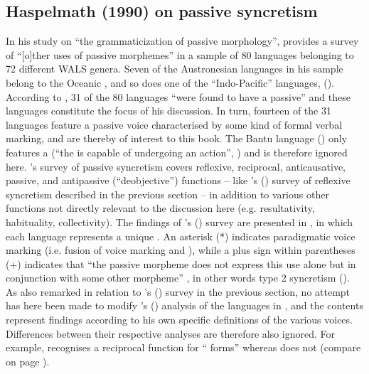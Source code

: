 \subsection{Haspelmath (1990) on passive syncretism} \label{haspelmath-syncretism}
In his study on “the grammaticization of passive morphology”, \cite[36]{haspelmath:1990} provides a survey of “[o]ther uses of passive morphemes” in a sample of 80 languages belonging to 72 different WALS genera. Seven of the Austronesian languages in his sample belong to the Oceanic , and so does one of the “Indo-Pacific” languages,  (). According to \cite[28]{haspelmath:1990}, 31 of the 80 languages “were found to have a passive” and these languages constitute the focus of his discussion. In turn, fourteen of the 31 languages feature a passive voice characterised by some kind of formal verbal marking, and are thereby of interest to this book. The Bantu language  () only features a  (“the  is capable of undergoing an action”, \citealt[33]{haspelmath:1990}) and is therefore ignored here. \citeauthor{haspelmath:1990}’s survey of passive syncretism covers reflexive, reciprocal, anticausative, passive, and antipassive (“deobjective”) functions -- like \citeauthor{geniusiene:1987}’s (\citeyear{geniusiene:1987}) survey of reflexive syncretism described in the previous section -- in addition to various other functions not directly relevant to the discussion here (e.g. resultativity, habituality, collectivity). The findings of \citeauthor{haspelmath:1990}’s (\citeyear{haspelmath:1990}) survey are presented in , in which each language represents a unique . An asterisk (*) indicates paradigmatic voice marking (i.e. fusion of voice marking and ), while a plus sign within parentheses (+) indicates that “the passive morpheme does not express this use alone but in conjunction with some other morpheme” \citep[36]{haspelmath:1990}, in other words type 2 syncretism (). As also remarked in relation to \citeauthor{geniusiene:1987}’s (\citeyear{geniusiene:1987}) survey in the previous section, no attempt has here been made to modify \citeauthor{haspelmath:1990}’s (\citeyear{haspelmath:1990}) analysis of the languages in , and the contents represent findings according to his own specific definitions of the various voices. Differences between their respective analyses are therefore also ignored. For example, \citeauthor{geniusiene:1987} recognises a reciprocal function for  “ forms” whereas \citeauthor{haspelmath:1990} does not (compare  on page \pageref{tab:ch3:geniusiene}). 

